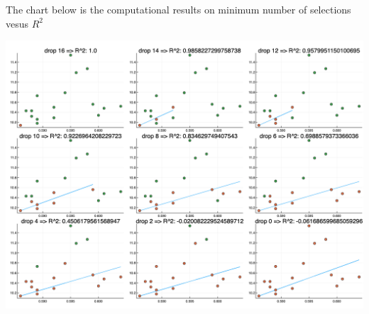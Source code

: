 \documentclass[
  10pt,
  a4paper,
,tablecaptionabove
]{scrartcl}
\begin{document}
The chart below is the computational results on minimum number of
selections vesus \(R^2\)

\includegraphics{src/output_filename.png}
\end{document}

